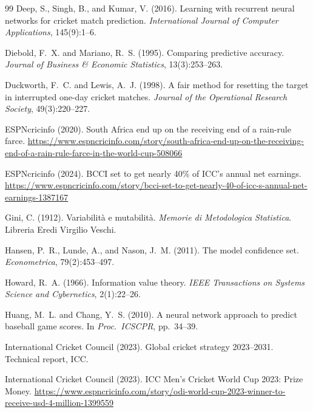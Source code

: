 \documentclass[10pt,a4paper,twocolumn]{article}
\begin{document}
\begin{thebibliography}{99}
Deep, S., Singh, B., and Kumar, V. (2016).
\newblock Learning with recurrent neural networks for cricket match prediction.
\newblock \emph{International Journal of Computer Applications}, 145(9):1--6.

Diebold, F.~X. and Mariano, R.~S. (1995).
\newblock Comparing predictive accuracy.
\newblock \emph{Journal of Business \& Economic Statistics}, 13(3):253--263.

Duckworth, F.~C. and Lewis, A.~J. (1998).
\newblock A fair method for resetting the target in interrupted one-day cricket matches.
\newblock \emph{Journal of the Operational Research Society}, 49(3):220--227.

ESPNcricinfo (2020).
\newblock South Africa end up on the receiving end of a rain-rule farce.
\newblock \url{https://www.espncricinfo.com/story/south-africa-end-up-on-the-receiving-end-of-a-rain-rule-farce-in-the-world-cup-508066}

ESPNcricinfo (2024).
\newblock BCCI set to get nearly 40\% of ICC's annual net earnings.
\newblock \url{https://www.espncricinfo.com/story/bcci-set-to-get-nearly-40-of-icc-s-annual-net-earnings-1387167}

Gini, C. (1912).
\newblock Variabilit\`a e mutabilit\`a.
\newblock \emph{Memorie di Metodologica Statistica}. Libreria Eredi Virgilio Veschi.

Hansen, P.~R., Lunde, A., and Nason, J.~M. (2011).
\newblock The model confidence set.
\newblock \emph{Econometrica}, 79(2):453--497.

Howard, R.~A. (1966).
\newblock Information value theory.
\newblock \emph{IEEE Transactions on Systems Science and Cybernetics}, 2(1):22--26.

Huang, M.~L. and Chang, Y.~S. (2010).
\newblock A neural network approach to predict baseball game scores.
\newblock In \emph{Proc.\ ICSCPR}, pp.~34--39.

International Cricket Council (2023).
\newblock Global cricket strategy 2023--2031. Technical report, ICC.

International Cricket Council (2023).
\newblock ICC Men's Cricket World Cup 2023: Prize Money.
\newblock \url{https://www.espncricinfo.com/story/odi-world-cup-2023-winner-to-receive-usd-4-million-1399559}


\end{thebibliography}
\end{document}
